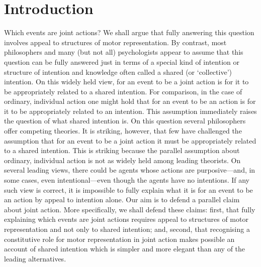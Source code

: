 \documentclass[12pt,\papersize]{extarticle}
\begin{document}
\section{Introduction}
Which events are joint actions?
We shall argue that fully answering this question involves appeal to structures of motor representation.
By contrast, 
most philosophers and many (but not all) psychologists appear to assume that this question can be fully answered just in terms of a special kind of intention or structure of intention and knowledge often called a shared (or `collective') intention.
On this widely held view, for an event to be a joint action is for it to be appropriately related to a shared intention.
For comparison, in the case of ordinary, individual action 
one might hold that for an event to be an action is for it to be appropriately related to an intention.
This assumption immediately raises the question of what shared intention is.
On this question several philosophers offer competing theories.
It is striking, however, that few have challenged the assumption that for an event to be a joint action it must be appropriately related to a shared intention.
This is striking because the parallel assumption about ordinary, individual action is not as widely held among leading theorists.
On several leading views, there could be agents whose actions are purposive---and, in some cases, even intentional---even though the agents have no intentions.
If any such view is correct, it is impossible to fully explain what it is for an event to be an action by appeal to intention alone.
Our aim is to defend a parallel claim about joint action.
More specifically, we shall defend these claims: 
first, 
that fully explaining which events are joint actions requires appeal to structures of motor representation and not only to shared intention;
and, 
second, 
that recognising a constitutive role for motor representation in joint action makes possible an account of shared intention which is simpler and more elegant than any of the leading alternatives.
\end{document}
